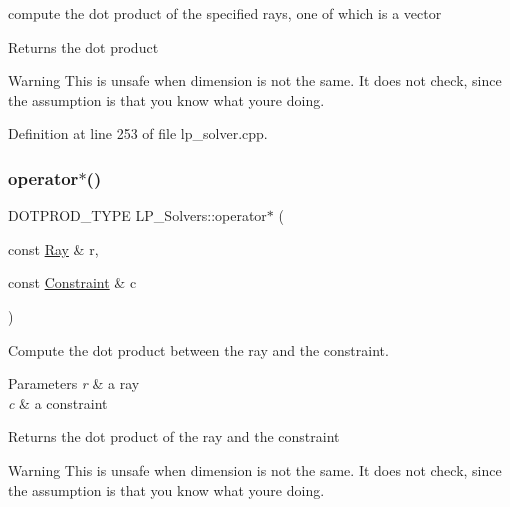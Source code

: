 compute the dot product of the specified rays, one of which is a vector 

\begin{DoxyReturn}{Returns}
the dot product 
\end{DoxyReturn}
\begin{DoxyWarning}{Warning}
This is unsafe when dimension is not the same. It does not check, since the assumption is that you know what you\textquotesingle{}re doing. 
\end{DoxyWarning}


Definition at line 253 of file lp\+\_\+solver.\+cpp.

\mbox{\label{group___c_l_s_solvers_gaea75db1559315f35242d62e9e5f66e92}} 
\subsubsection{\texorpdfstring{operator$\ast$()}{operator*()}\hspace{0.1cm}{\footnotesize\ttfamily [5/6]}}
{\footnotesize\ttfamily D\+O\+T\+P\+R\+O\+D\+\_\+\+T\+Y\+PE L\+P\+\_\+\+Solvers\+::operator$\ast$ (\begin{DoxyParamCaption}\item[{const \hyperlink{group___c_l_s_solvers_class_l_p___solvers_1_1_ray}{Ray} \&}]{r,  }\item[{const \hyperlink{group___c_l_s_solvers_class_l_p___solvers_1_1_constraint}{Constraint} \&}]{c }\end{DoxyParamCaption})\hspace{0.3cm}{\ttfamily [inline]}}



Compute the dot product between the ray and the constraint. 


\begin{DoxyParams}{Parameters}
{\em r} & a ray \\
\hline
{\em c} & a constraint \\
\hline
\end{DoxyParams}
\begin{DoxyReturn}{Returns}
the dot product of the ray and the constraint 
\end{DoxyReturn}
\begin{DoxyWarning}{Warning}
This is unsafe when dimension is not the same. It does not check, since the assumption is that you know what you\textquotesingle{}re doing. 
\end{DoxyWarning}


